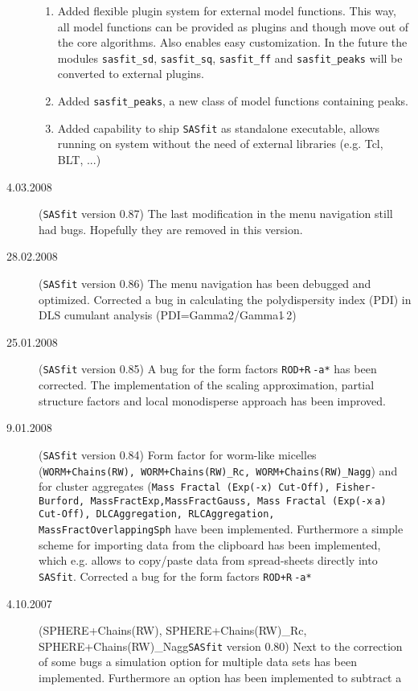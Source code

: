 \begin{description}
\begin{enumerate}
        \item Added flexible plugin system for external model functions. This way, all model functions can be provided
                as plugins and though move out of the core algorithms. Also enables easy customization. In the future
                the modules \texttt{sasfit\_sd}, \texttt{sasfit\_sq}, \texttt{sasfit\_ff} and \texttt{sasfit\_peaks}
                will be converted to external plugins.
        \item Added \texttt{sasfit\_peaks}, a new class of model functions containing peaks.
        \item Added capability to ship {\tt SASfit} as standalone executable, allows running on system without the
                need of external libraries (e.g. Tcl, BLT, ...)
    \end{enumerate}
    \item[4.03.2008] ({\tt SASfit} version 0.87) The last
    modification in the menu navigation still had bugs. Hopefully
    they are removed in this version.
    \item[28.02.2008] ({\tt SASfit} version 0.86)
    The menu navigation has been debugged and optimized.
    Corrected a bug in calculating the polydispersity index (PDI)
    in DLS cumulant analysis (PDI=Gamma2/Gamma1$\hat{~}$2)
    \item[25.01.2008] ({\tt SASfit} version 0.85)
    A bug for the form factors  \texttt{ROD+R$\hat{~}$-a*} has
    been corrected. The implementation of the scaling
    approximation, partial structure factors and local monodisperse
    approach has been improved.
    \item[9.01.2008] ({\tt SASfit} version 0.84) Form factor for
    worm-like micelles (\texttt{WORM+Chains(RW), WORM+Chains(RW)\_Rc,
    WORM+Chains(RW)\_Nagg}) and for cluster aggregates
    (\texttt{Mass Fractal (Exp(-x) Cut-Off), Fisher-Burford,
    MassFractExp,MassFractGauss, Mass Fractal (Exp(-x$\hat{~}$a) Cut-Off), DLCAggregation,
    RLCAggregation, MassFractOverlappingSph} have been implemented. Furthermore a simple scheme for importing data
    from the clipboard has been implemented, which e.g. allows to copy/paste
    data from spread-sheets directly into {\tt SASfit}.
    Corrected a bug for the form factors  \texttt{ROD+R$\hat{~}$-a*}
    \item[4.10.2007] ({SPHERE+Chains(RW), SPHERE+Chains(RW)\_Rc, SPHERE+Chains(RW)\_Nagg\tt SASfit} version 0.80)
    Next to the correction of some bugs a simulation option for
    multiple data sets has been implemented. Furthermore an option has been implemented to subtract a

\end{description}
